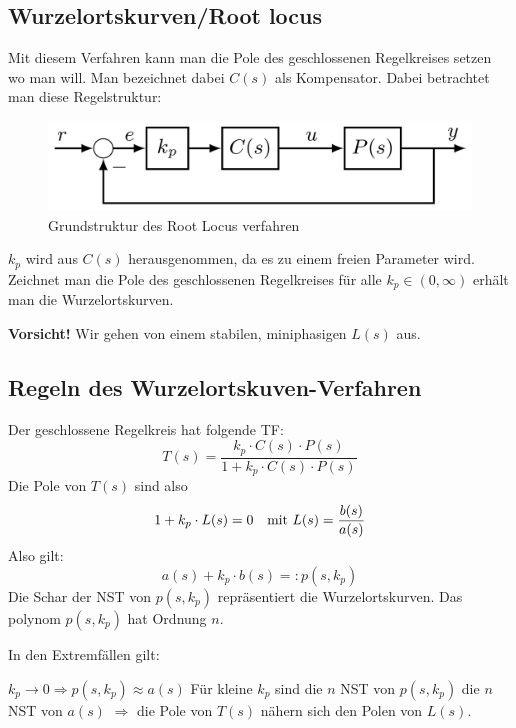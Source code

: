 \subsection{Wurzelortskurven/Root locus}
    Mit diesem Verfahren kann man die Pole des geschlossenen Regelkreises setzen wo man will. Man bezeichnet dabei $C(s)$ als Kompensator. Dabei betrachtet man diese Regelstruktur:
    \begin{figure}[H]
        \centering
        \includegraphics[width = 0.5\linewidth]{images/04/RL_sys.jpeg}
        \caption{Grundstruktur des Root Locus verfahren}
    \end{figure}
    
    $k_p$ wird aus $C(s)$ herausgenommen, da es zu einem freien Parameter wird. Zeichnet man die Pole des geschlossenen Regelkreises für alle $k_p \in(0,\infty)$ erhält man die Wurzelortskurven.
    
    \textbf{Vorsicht!} Wir gehen von einem stabilen, miniphasigen $L(s)$ aus.
    
\subsection{Regeln des Wurzelortskuven-Verfahren}
    Der geschlossene Regelkreis hat folgende TF:
    \begin{equation*}
        T(s) = \frac{k_p\cdot C(s)\cdot P(s)}{1 + k_p\cdot C(s)\cdot P(s)}
    \end{equation*}
    Die Pole von $T(s)$ sind also
    \begin{equation*}
        1 + k_p\cdot L(s) = 0 \quad\textnormal{mit } L(s) = \frac{b(s)}{a(s)} 
    \end{equation*}
    Also gilt:
    \begin{equation*}
        a(s) + k_p\cdot b(s) =: p(s,k_p)
    \end{equation*}
    Die Schar der NST von $p(s,k_p)$ repräsentiert die Wurzelortskurven. Das polynom $p(s,k_p)$ hat Ordnung $n$.
    
    In den Extremfällen gilt:
    
    $\boxed{k_p \rightarrow 0 \Rightarrow p(s,k_p) \approx a(s)}$ Für kleine $k_p$ sind die $n$ NST von $p(s,k_p)$ die $n$ NST von $a(s)$ $\Rightarrow$ die Pole von $T(s)$ nähern sich den Polen von $L(s)$.
    
